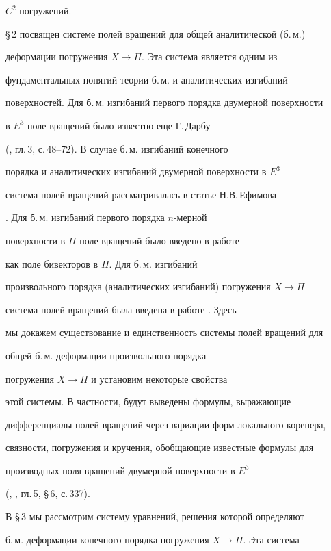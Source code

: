 $C^2$-погружений.





\S\,2 посвящен системе полей вращений для общей аналитической (б.\,м.)


деформации погружения $X\to\Pi$. Эта система является одним из


фундаментальных понятий теории б.\,м. и аналитических изгибаний


поверхностей. Для б.\,м. изгибаний первого порядка двумерной поверхности


в $E^3$ поле вращений было известно еще Г.\,Дарбу


(\cite{Dar}, гл.\,3, с.\,48--72). В случае б.\,м. изгибаний конечного


порядка и аналитических изгибаний двумерной поверхности в $E^3$


система полей вращений рассматривалась в статье Н.В.\,Ефимова


\cite{Efi}. Для б.\,м. изгибаний первого порядка $n$-мерной


поверхности в $\Pi$ поле вращений было введено в работе


\cite{Mark1} как поле бивекторов в $\Pi$. Для б.\,м. изгибаний


произвольного порядка (аналитических изгибаний) погружения $X\to\Pi$


система полей вращений была введена в работе \cite{Mark2}. Здесь


мы докажем существование и единственность системы полей вращений для


общей б.\,м. деформации произвольного порядка


погружения $X\to\Pi$ и установим некоторые свойства


этой системы. В частности, будут выведены формулы, выражающие


дифференциалы полей вращений через вариации форм локального корепера,


связности, погружения и кручения, обобщающие известные формулы для


производных поля вращений двумерной поверхности в $E^3$


(\cite{Efi}, \cite{Vek}, гл.\,5, \S\,6, с.\,337).





В \S\,3 мы рассмотрим систему уравнений, решения которой определяют


б.\,м. деформации конечного порядка погружения $X\to\Pi$. Эта система


